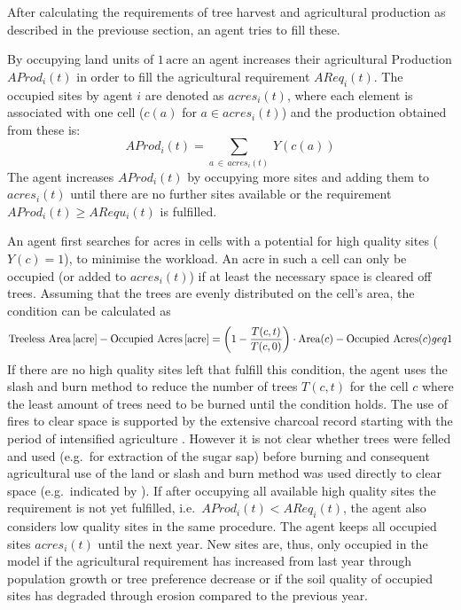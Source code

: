 After calculating the requirements of tree harvest and agricultural production as described in the previouse section, an agent tries to fill these.

By occupying land units of $1\, \text{acre}$ an agent increases their agricultural Production $AProd_i(t)$ in order to fill the agricultural requirement $AReq_i(t)$.
The occupied sites by agent $i$ are denoted as $acres_i(t)$, where each element is associated with one cell ($c(a)$ for $a \in acres_i(t)$) and the production obtained from these is:
\begin{equation}
	AProd_i (t) = \sum_{a \, \in \, acres_i(t)} \, Y(c(a))
	\label{AProd}
\end{equation}
The agent increases $AProd_i(t)$ by occupying more sites and adding them to $acres_i(t)$ until there are no further sites available or the requirement $AProd_i(t) \geq ARequ_i(t)$ is fulfilled.

An agent first searches for acres in cells with a potential for high quality sites ($Y(c)=1$), to minimise the workload.
An acre in such a cell can only be occupied (or added to $acres_i(t)$) if at least the necessary space is cleared off trees. 
Assuming that the trees are evenly distributed on the cell's area, the condition can be calculated as 
\begin{equation}
	\text{Treeless Area\,[acre]} - \text{Occupied Acres\,[acre]}  = 
	\left( 1 - \frac{T(c,t)}{T(c,0)} \right) \cdot \text{Area}(c) - \text{Occupied Acres}(c) geq 1
	\label{eq:BurningCond}
\end{equation}
If there are no high quality sites left that fulfill this condition, the agent uses the slash and burn method to reduce the number of trees $T(c,t)$ for the cell $c$ where the least amount of trees need to be burned until the condition holds.
The use of fires to clear space is supported by the extensive charcoal record starting with the period of intensified agriculture \citep{Mieth2015}. 
However it is not clear whether trees were felled and used (e.g.\ for extraction of the sugar sap) before burning and consequent agricultural use of the land \citep{Mieth2015} or slash and burn method was used directly to clear space (e.g.\ indicated by \citet{Bahn2017}). %
If after occupying all available high quality sites the requirement is not yet fulfilled, i.e.\ $AProd_i(t)<AReq_i(t)$, the agent also considers low quality sites in the same procedure.
The agent keeps all occupied sites $acres_i(t)$ until the next year.%
New sites are, thus, only occupied in the model if the agricultural requirement has increased from last year through population growth or tree preference decrease or if the soil quality of occupied sites has degraded through erosion compared to the previous year.

